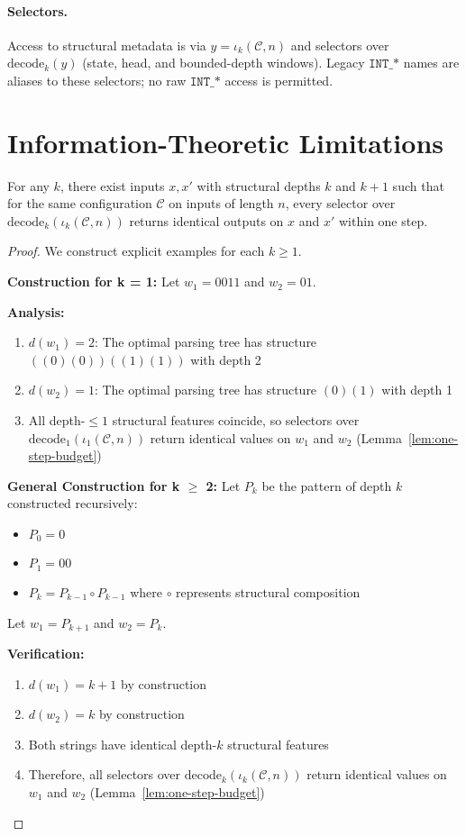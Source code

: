 \paragraph{Selectors.} Access to structural metadata is via $y=\iota_k(\mathcal{C},n)$ and selectors over $\mathrm{decode}_k(y)$ (state, head, and bounded-depth windows). Legacy $\texttt{INT\_*}$ names are aliases to these selectors; no raw $\texttt{INT\_*}$ access is permitted.

\section{Information-Theoretic Limitations}

\begin{lemma}
For any $k$, there exist inputs $x,x'$ with structural depths $k$ and $k{+}1$ such that for the same configuration $\mathcal{C}$ on inputs of length $n$, every selector over $\mathrm{decode}_k(\iota_k(\mathcal{C},n))$ returns identical outputs on $x$ and $x'$ within one step.
\end{lemma}

\begin{proof}
We construct explicit examples for each $k \geq 1$.

\textbf{Construction for k = 1:}
Let $w_1 = 0011$ and $w_2 = 01$.

\textbf{Analysis:}
\begin{enumerate}
\item $d(w_1) = 2$: The optimal parsing tree has structure $((0)(0))((1)(1))$ with depth 2
\item $d(w_2) = 1$: The optimal parsing tree has structure $(0)(1)$ with depth 1
\item All depth-$\le 1$ structural features coincide, so selectors over $\mathrm{decode}_1(\iota_1(\mathcal{C},n))$ return identical values on $w_1$ and $w_2$ (Lemma~\ref{lem:one-step-budget})
\end{enumerate}

\textbf{General Construction for k \ensuremath{\geq} 2:}
Let $P_k$ be the pattern of depth $k$ constructed recursively:
\begin{itemize}
\item $P_0 = 0$
\item $P_1 = 00$
\item $P_k = P_{k-1} \circ P_{k-1}$ where $\circ$ represents structural composition
\end{itemize}

Let $w_1 = P_{k+1}$ and $w_2 = P_k$.

\textbf{Verification:}
\begin{enumerate}
\item $d(w_1) = k+1$ by construction
\item $d(w_2) = k$ by construction
\item Both strings have identical depth-$k$ structural features
\item Therefore, all selectors over $\mathrm{decode}_k(\iota_k(\mathcal{C},n))$ return identical values on $w_1$ and $w_2$ (Lemma~\ref{lem:one-step-budget})
\end{enumerate}
\end{proof}

